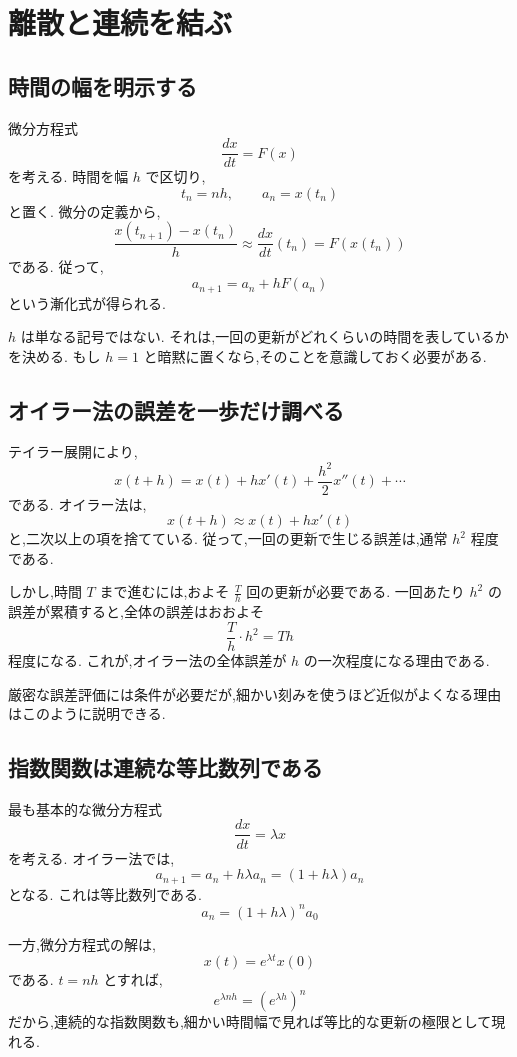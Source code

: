
\section{離散と連続を結ぶ}

\subsection{時間の幅を明示する}

微分方程式
\[
  \frac{dx}{dt}=F(x)
\]
を考える.
時間を幅 $h$ で区切り,
\[
  t_n=nh,\qquad a_n=x(t_n)
\]
と置く.
微分の定義から,
\[
  \frac{x(t_{n+1})-x(t_n)}h
  \approx \frac{dx}{dt}(t_n)
  =F(x(t_n))
\]
である.
従って,
\[
  a_{n+1}=a_n+hF(a_n)
\]
という漸化式が得られる.

$h$ は単なる記号ではない.
それは,一回の更新がどれくらいの時間を表しているかを決める.
もし $h=1$ と暗黙に置くなら,そのことを意識しておく必要がある.

\subsection{オイラー法の誤差を一歩だけ調べる}

テイラー展開により,
\[
  x(t+h)
  =x(t)+hx'(t)+\frac{h^2}{2}x''(t)+\cdots
\]
である.
オイラー法は,
\[
  x(t+h)\approx x(t)+hx'(t)
\]
と,二次以上の項を捨てている.
従って,一回の更新で生じる誤差は,通常 $h^2$ 程度である.

しかし,時間 $T$ まで進むには,およそ $\frac{T}{h}$ 回の更新が必要である.
一回あたり $h^2$ の誤差が累積すると,全体の誤差はおおよそ
\[
  \frac{T}{h}\cdot h^2=Th
\]
程度になる.
これが,オイラー法の全体誤差が $h$ の一次程度になる理由である.

厳密な誤差評価には条件が必要だが,細かい刻みを使うほど近似がよくなる理由はこのように説明できる.

\subsection{指数関数は連続な等比数列である}

最も基本的な微分方程式
\[
  \frac{dx}{dt}=\lambda x
\]
を考える.
オイラー法では,
\[
  a_{n+1}=a_n+h\lambda a_n
  =(1+h\lambda)a_n
\]
となる.
これは等比数列である.
\[
  a_n=(1+h\lambda)^n a_0
\]

一方,微分方程式の解は,
\[
  x(t)=e^{\lambda t}x(0)
\]
である.
$t=nh$ とすれば,
\[
  e^{\lambda nh}=\left(e^{\lambda h}\right)^n
\]
だから,連続的な指数関数も,細かい時間幅で見れば等比的な更新の極限として現れる.

